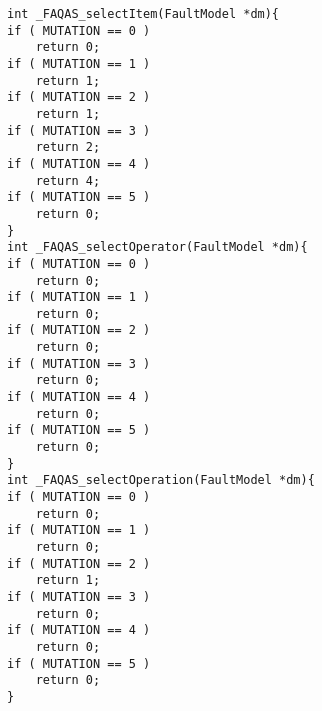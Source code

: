 
\begin{minipage}{15cm}
\begin{lstlisting}[style=CStyle, caption=Automatically generated selectors., label=selectors, mathescape=true]
int _FAQAS_selectItem(FaultModel *dm){
if ( MUTATION == 0 )
    return 0;
if ( MUTATION == 1 )
    return 1;
if ( MUTATION == 2 )
    return 1;
if ( MUTATION == 3 )
    return 2;
if ( MUTATION == 4 )
    return 4;
if ( MUTATION == 5 )
    return 0;
}
int _FAQAS_selectOperator(FaultModel *dm){
if ( MUTATION == 0 )
    return 0;
if ( MUTATION == 1 )
    return 0;
if ( MUTATION == 2 )
    return 0;
if ( MUTATION == 3 )
    return 0;
if ( MUTATION == 4 )
    return 0;
if ( MUTATION == 5 )
    return 0;
}
int _FAQAS_selectOperation(FaultModel *dm){
if ( MUTATION == 0 )
    return 0;
if ( MUTATION == 1 )
    return 0;
if ( MUTATION == 2 )
    return 1;
if ( MUTATION == 3 )
    return 0;
if ( MUTATION == 4 )
    return 0;
if ( MUTATION == 5 )
    return 0;
}
\end{lstlisting}
\end{minipage}


